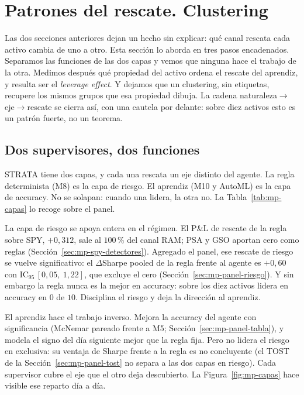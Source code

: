\section{Patrones del rescate. Clustering}
\label{sec:mp-mecanismo}


Las dos secciones anteriores dejan un hecho sin explicar: qué canal rescata cada activo cambia de uno a otro. Esta sección lo aborda en tres pasos encadenados. Separamos las funciones de las dos capas y vemos que ninguna hace el trabajo de la otra. Medimos después qué propiedad del activo ordena el rescate del aprendiz, y resulta ser el \emph{leverage effect}. Y dejamos que un clustering, sin etiquetas, recupere los mismos grupos que esa propiedad dibuja. La cadena naturaleza$\to$eje$\to$rescate se cierra así, con una cautela por delante: sobre diez activos esto es un patrón fuerte, no un teorema.

\subsection{Dos supervisores, dos funciones}
\label{sec:mp-mec-capas}

STRATA tiene dos capas, y cada una rescata un eje distinto del agente. La regla determinista (M8) es la capa de riesgo. El aprendiz (M10 y AutoML) es la capa de accuracy. No se solapan: cuando una lidera, la otra no. La Tabla~\ref{tab:mp-capas} lo recoge sobre el panel.

La capa de riesgo se apoya entera en el régimen. El P\&L de rescate de la regla sobre SPY, $+0{,}312$, sale al $100\,\%$ del canal RAM; PSA y GSO aportan cero como reglas (Sección~\ref{sec:mp-spy-detectores}). Agregado el panel, ese rescate de riesgo se vuelve significativo: el $\Delta$Sharpe pooled de la regla frente al agente es $+0{,}60$ con IC$_{95}\,[0{,}05,\ 1{,}22]$, que excluye el cero (Sección~\ref{sec:mp-panel-riesgo}). Y sin embargo la regla nunca es la mejor en accuracy: sobre los diez activos lidera en accuracy en $0$ de $10$. Disciplina el riesgo y deja la dirección al aprendiz.

El aprendiz hace el trabajo inverso. Mejora la accuracy del agente con significancia (McNemar pareado frente a M5; Sección~\ref{sec:mp-panel-tabla}), y modela el signo del día siguiente mejor que la regla fija. Pero no lidera el riesgo en exclusiva: su ventaja de Sharpe frente a la regla es no concluyente (el TOST de la Sección~\ref{sec:mp-panel-tost} no separa a las dos capas en riesgo). Cada supervisor cubre el eje que el otro deja descubierto. La Figura~\ref{fig:mp-capas} hace visible ese reparto día a día.

